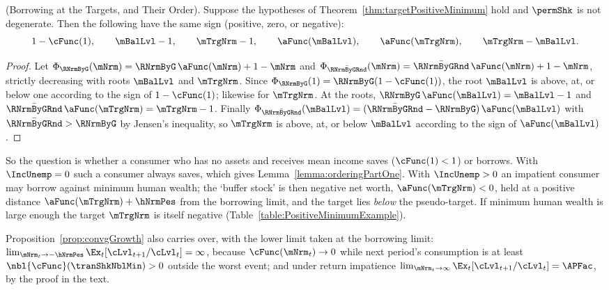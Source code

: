 \documentclass[\econtexRoot/BufferStockTheory]{subfiles}
\begin{document}
\begin{lemma}(Borrowing at the Targets, and Their Order).\label{lemma:orderingPositiveMinimum}
Suppose the hypotheses of Theorem~\ref{thm:targetPositiveMinimum} hold and $\permShk$ is not degenerate.
Then the following have the same sign (positive, zero, or negative):
\begin{equation*}
  1-\cFunc(1),\qquad \mBalLvl-1,\qquad \mTrgNrm-1,\qquad \aFunc(\mBalLvl),\qquad \aFunc(\mTrgNrm),\qquad \mTrgNrm-\mBalLvl .
\end{equation*}
\end{lemma}

\begin{proof}
Let $\Phi_{\RNrmByG}(\mNrm)=\RNrmByG\,\aFunc(\mNrm)+1-\mNrm$ and $\Phi_{\bar{\RNrmByGRnd}}(\mNrm)=\bar{\RNrmByGRnd}\,\aFunc(\mNrm)+1-\mNrm$, strictly decreasing with roots $\mBalLvl$ and $\mTrgNrm$.
Since $\Phi_{\RNrmByG}(1)=\RNrmByG(1-\cFunc(1))$, the root $\mBalLvl$ is above, at, or below one according to the sign of $1-\cFunc(1)$; likewise for $\mTrgNrm$.
At the roots, $\RNrmByG\,\aFunc(\mBalLvl)=\mBalLvl-1$ and $\bar{\RNrmByGRnd}\,\aFunc(\mTrgNrm)=\mTrgNrm-1$.
Finally $\Phi_{\bar{\RNrmByGRnd}}(\mBalLvl)=(\bar{\RNrmByGRnd}-\RNrmByG)\,\aFunc(\mBalLvl)$ with $\bar{\RNrmByGRnd}>\RNrmByG$ by Jensen's inequality, so $\mTrgNrm$ is above, at, or below $\mBalLvl$ according to the sign of $\aFunc(\mBalLvl)$.
\end{proof}

So the question is whether a consumer who has no assets and receives mean income saves ($\cFunc(1)<1$) or borrows.
With $\IncUnemp=0$ such a consumer always saves, which gives Lemma~\ref{lemma:orderingPartOne}.
With $\IncUnemp>0$ an impatient consumer may borrow against minimum human wealth; the `buffer stock' is then negative net worth, $\aFunc(\mTrgNrm)<0$, held at a positive distance $\aFunc(\mTrgNrm)+\hNrmPes$ from the borrowing limit, and the target lies \emph{below} the pseudo-target.
If minimum human wealth is large enough the target $\mTrgNrm$ is itself negative (Table~\ref{table:PositiveMinimumExample}).

Proposition~\ref{prop:convgGrowth} also carries over, with the lower limit taken at the borrowing limit: $\lim_{\mNrm_{t}\rightarrow-\hNrmPes}\Ex_{t}[\cLvl_{t+1}/\cLvl_{t}]=\infty$, because $\cFunc(\mNrm_{t})\rightarrow 0$ while next period's consumption is at least $\nbl{\cFunc}(\tranShkNblMin)>0$ outside the worst event; and under return impatience $\lim_{\mNrm_{t}\rightarrow\infty}\Ex_{t}[\cLvl_{t+1}/\cLvl_{t}]=\APFac$, by the proof in the text.
\end{document}

